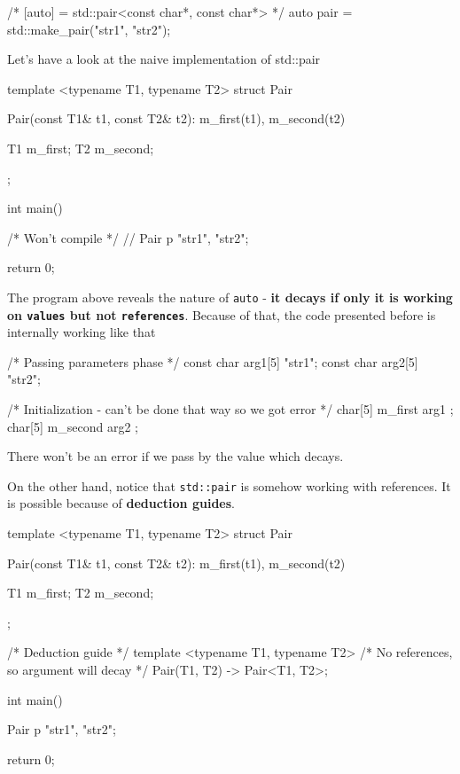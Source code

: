 \documentclass[../main]{subfiles}
\begin{document}
\begin{Code}
    /* [auto] = std::pair<const char*, const char*> */
    auto pair = std::make_pair("str1", "str2");
\end{Code}
\noindent
Let's have a look at the naive implementation of std::pair

\begin{Code}
    template <typename T1, typename T2>
    struct Pair
    {
        Pair(const T1& t1, const T2& t2): m_first(t1), m_second(t2)
        {
        }
        
        T1 m_first;
        T2 m_second;
    };
    
    int main()
    {
        /* Won't compile */
        // Pair p {"str1", "str2"};
    
        return 0;
    }
\end{Code}

    The program above reveals the nature of \texttt{auto} - \textbf{it decays if only it is working on \texttt{values} but not \texttt{references}}. Because
of that, the code presented before is internally working like that
\begin{Code}
    /* Passing parameters phase */
    const char arg1[5] {"str1"};
    const char arg2[5] {"str2"};

    /* Initialization - can't be done that way so we got error */
    char[5] m_first { arg1 }; 
    char[5] m_second { arg2 };
\end{Code}
\noindent
There won't be an error if we pass by the value which decays.\newline

    On the other hand, notice that \texttt{std::pair} is somehow working with references. It is possible because of
\textbf{deduction guides}.

\begin{Code}
template <typename T1, typename T2>
struct Pair
{
    Pair(const T1& t1, const T2& t2): m_first(t1), m_second(t2)
    {
    }
    
    T1 m_first;
    T2 m_second;
};

/* Deduction guide */
template <typename T1, typename T2>
/* No references, so argument will decay */
Pair(T1, T2) -> Pair<T1, T2>;

int main()
{
    Pair p {"str1", "str2"};

    return 0;
}
\end{Code}
\end{document}
